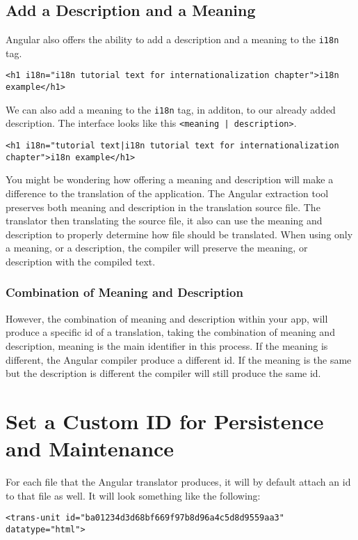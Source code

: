 
\subsection{Add a Description and a Meaning}
Angular also offers the ability to add a description and a meaning to the
\lstinline{i18n} tag. 
\begin{lstlisting}[caption=i18n description]
<h1 i18n="i18n tutorial text for internationalization chapter">i18n example</h1>
\end{lstlisting}

We can also add a meaning to the \lstinline{i18n} tag, in additon, to our already added description. The interface looks like this 
\lstinline{<meaning | description>}.

\begin{lstlisting}[caption=i18n \lstinline{<meaning | description>} Example]<h1 i18n="tutorial text|i18n tutorial text for internationalization chapter">i18n example</h1>
\end{lstlisting}

You might be wondering how offering a meaning and description will make a difference to the translation of the application. The Angular extraction tool preserves both meaning and description in the translation source file. The translator then translating the source file, it also can use the meaning and description to properly determine how file should be translated. When using only a meaning, or a description, the compiler will preserve the meaning, or description with the compiled text.

\subsubsection{Combination of Meaning and Description}
However, the combination of meaning and description within your app, will produce a specific id of a translation, taking the combination of meaning and description, meaning is the main identifier in this process. If the meaning is different, the Angular compiler produce a different id. If  the meaning is the same but the description is different the compiler will still produce the same id. 

\section{Set a Custom ID for Persistence and Maintenance}
For each file that the Angular translator produces, it will by default attach an id to that file as well. It will look something like the following: 
\begin{lstlisting}[caption=example.fr.xlf.html]
<trans-unit id="ba01234d3d68bf669f97b8d96a4c5d8d9559aa3" datatype="html">
\end{lstlisting}

